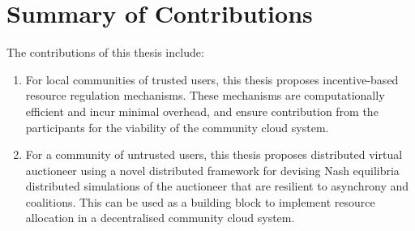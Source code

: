 
\section{Summary of Contributions}
\label{sec:contrib}

The contributions of this thesis include:

\begin{enumerate}

	\item For local communities of trusted users, this thesis proposes incentive-based resource regulation mechanisms.
	These mechanisms are computationally efficient and incur minimal overhead,
	and ensure contribution from the participants for the viability of the community cloud system.

	\item For a community of untrusted users, this thesis proposes distributed virtual auctioneer 
	using a novel distributed framework for devising Nash equilibria 
	distributed simulations of the auctioneer that are resilient to asynchrony and coalitions. 
	This can be used as a building block to implement resource allocation in a decentralised community cloud system.

\end{enumerate}
